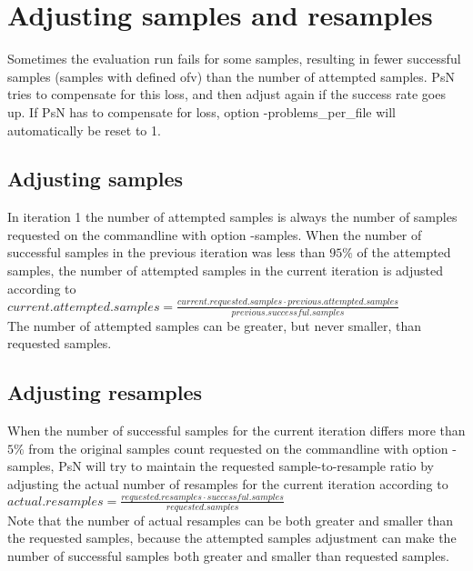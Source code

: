 \section{Adjusting samples and resamples}
Sometimes the evaluation run fails for some samples, resulting in fewer successful samples (samples with defined ofv)
than the number of attempted samples. PsN tries to compensate for this loss, and then
adjust again if the success rate goes up. If PsN has to compensate for loss, option -problems\_per\_file will 
automatically be reset to 1.
\subsection{Adjusting samples}
In iteration 1 the number of attempted samples is always the number of
samples requested on the commandline with option -samples.
When the number of successful samples in the previous iteration was less than
$95\%$ of the attempted samples, the number of attempted samples in the current 
iteration is adjusted according to\\
$current.attempted.samples=\frac{current.requested.samples \cdot previous.attempted.samples}{previous.successful.samples}$\\
The number of attempted samples can be greater, but never smaller, than requested samples.

\subsection{Adjusting resamples}
When the number of successful samples for the current iteration 
differs more than $5\%$ from the original samples count requested on the commandline with option -samples,
PsN will try to maintain the requested sample-to-resample ratio by 
adjusting the actual number of resamples for the current iteration 
according to \\
$actual.resamples=\frac{requested.resamples\cdot successful.samples}{requested.samples}$\\
Note that the number of actual resamples can be both greater and smaller than the 
requested samples, because the attempted samples adjustment can make 
the number of successful samples both greater and smaller
than requested samples.




